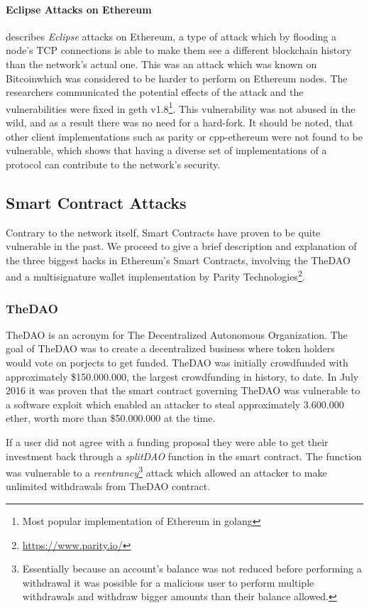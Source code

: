 \paragraph{Eclipse Attacks on Ethereum}
\cite{cryptoeprint:2018:236} describes \textit{Eclipse} attacks on Ethereum, a type of attack which by flooding a node's TCP connections is able to make them see a different blockchain history than the network's actual one. This was an attack which was known on Bitcoinwhich was considered to be harder to perform on Ethereum nodes. The researchers communicated the potential effects of the attack and the vulnerabilities were fixed in geth v1.8\footnote{Most popular implementation of Ethereum in golang}. This vulnerability was not abused in the wild, and as a result there was no need for a hard-fork. It should be noted, that other client implementations such as parity or cpp-ethereum were not found to be vulnerable, which shows that having a diverse set of implementations of a protocol can contribute to the network's security.

\subsection{Smart Contract Attacks}
Contrary to the network itself, Smart Contracts have proven to be quite vulnerable in the past. We proceed to give a brief description and explanation of the three biggest hacks in Ethereum's Smart Contracts, involving the TheDAO and a multisignature wallet implementation by Parity Technologies\footnote{\url{https://www.parity.io/}}.

\subsubsection{TheDAO}
TheDAO is an acronym for The Decentralized Autonomous Organization. The goal of TheDAO was to create a decentralized business where token holders would vote on porjects to get funded. TheDAO was initially crowdfunded with approximately \$150.000.000, the largest crowdfunding in history, to date. In July 2016 it was proven that the smart contract governing TheDAO was vulnerable to a software exploit which enabled an attacker to steal approximately 3.600.000 ether, worth more than \$50.000.000 at the time.

If a user did not agree with a funding proposal they were able to get their investment back through a \textit{splitDAO} function in the smart contract. The function was vulnerable to a \textit{reentrancy}\footnote{Essentially because an account's balance was not reduced before performing a withdrawal it was possible for a malicious user to perform multiple withdrawals and withdraw bigger amounts than their balance allowed.} attack which allowed an attacker to make unlimited withdrawals from TheDAO contract\cite{bloombergdao,hackingdistibuteddao}.

